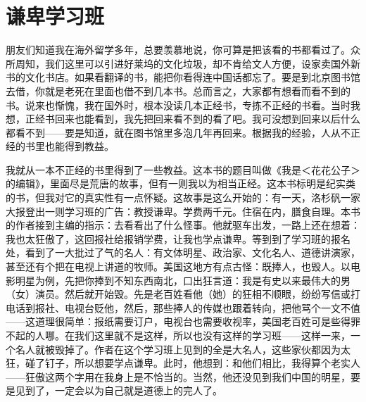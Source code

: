 \chapter{谦卑学习班}

朋友们知道我在海外留学多年，总要羡慕地说，你可算是把该看的书都看过了。众所周知，我们这里可以引进好莱坞的文化垃圾，却不肯给文人方便，设家卖国外新书的文化书店。如果看翻译的书，能把你看得连中国话都忘了。要是到北京图书馆去借，你就是老死在里面也借不到几本书。总而言之，大家都有想看而看不到的书。说来也惭愧，我在国外时，根本没读几本正经书，专拣不正经的书看。当时我想，正经书回来也能看到，我先把回来看不到的看了吧。我可没想到回来以后什么都看不到——要是知道，就在图书馆里多泡几年再回来。根据我的经验，人从不正经的书里也能得到教益。　 

我就从一本不正经的书里得到了一些教益。这本书的题目叫做《我是＜花花公子＞的编辑》，里面尽是荒唐的故事，但有一则我以为相当正经。这本书标明是纪实类的书，但我对它的真实性有一点怀疑。这故事是这么开始的：有一天，洛杉矾一家大报登出一则学习班的广告：教授谦卑。学费两千元。住宿在内，膳食自理。本书的作者接到主编的指示：去看看出了什么怪事。他就驱车出发，一路上还在想着：我也太狂傲了，这回报社给报销学费，让我也学点谦卑。等到到了学习班的报名处，看到了一大批过了气的名人：有文体明星、政治家、文化名人、道德讲演家，甚至还有个把在电视上讲道的牧师。美国这地方有点古怪：既捧人，也毁人。以电影明星为例，先把你捧到不知东西南北，口出狂言道：我是有史以来最伟大的男（女）演员。然后就开始毁。先是老百姓看他（她）的狂相不顺眼，纷纷写信或打电话到报社、电视台贬他，然后，那些捧人的传媒也跟着转向，把他骂个一文不值——这道理很简单：报纸需要订户，电视台也需要收视率，美国老百姓可是些得罪不起的人哪。在我们这里就不是这样，所以也没有这样的学习班——这样一来，一个名人就被毁掉了。作者在这个学习班上见到的全是大名人，这些家伙都因为太狂，碰了钉子，所以想要学点谦卑。此时，他想到：和他们相比，我得算个老实人——狂傲这两个字用在我身上是不恰当的。当然，他还没见到我们中国的明星，要是见到了，一定会以为自己就是道德上的完人了。　 

